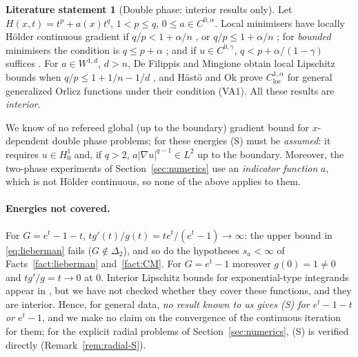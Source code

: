 \documentclass[11pt]{amsart}
\theoremstyle{definition}
\newtheorem{fact}[theorem]{Literature statement}
\theoremstyle{remark}
\numberwithin{equation}{section}
\newcommand{\abs}[1]{\lvert #1\rvert}
\begin{document}
\begin{fact}[Double phase: interior results only]\label{fact:dp}
Let $H(x,t)=t^p+a(x)t^q$, $1<p\le q$, $0\le a\in C^{0,\alpha}$. Local minimisers have locally H\"older continuous gradient if $q/p<1+\alpha/n$ \cite[Thm.~1.2]{ColomboMingione2015a}, or $q/p\le1+\alpha/n$ \cite[Thm.~1.1]{BaroniColomboMingione2018}; for \emph{bounded} minimisers the condition is $q\le p+\alpha$ \cite{ColomboMingione2015b,BaroniColomboMingione2018}; and if $u\in C^{0,\gamma}$, $q<p+\alpha/(1-\gamma)$ suffices \cite[Thm.~1.3]{BaroniColomboMingione2018}. For $a\in W^{1,d}$, $d>n$, De Filippis and Mingione obtain local Lipschitz bounds when $q/p\le1+1/n-1/d$ \cite[Thm.~1.3]{DeFilippisMingione2021}, and H\"ast\"o and Ok \cite{HastoOk2022} prove $C^{1,\alpha}_{\mathrm{loc}}$ for general generalized Orlicz functions under their condition (VA1). All these results are \emph{interior}.
\end{fact}
We know of no refereed global (up to the boundary) gradient bound for $x$-dependent double phase problems; for these energies (S) must be \emph{assumed}: it requires $u\in H^1_0$ and, if $q>2$, $a\abs{\nabla u}^{q-1}\in L^2$ up to the boundary. Moreover, the two-phase experiments of Section~\ref{sec:numerics} use an \emph{indicator function} $a$, which is not H\"older continuous, so none of the above applies to them.

\paragraph{Energies not covered.} For $G=e^t-1-t$, $tg'(t)/g(t)=te^t/(e^t-1)\to\infty$: the upper bound in \eqref{eq:lieberman} fails ($G\notin\Delta_2$), and so do the hypotheses $s_a<\infty$ of Facts~\ref{fact:lieberman} and~\ref{fact:CM}. For $G=e^t-1$ moreover $g(0)=1\ne0$ and $tg'/g=t\to0$ at $0$. Interior Lipschitz bounds for exponential-type integrands appear in \cite[Thms.~1.4--1.5]{DeFilippisMingione2021}, but we have not checked whether they cover these functions, and they are interior. Hence, for general data, \emph{no result known to us gives (S) for $e^t-1-t$ or $e^t-1$}, and we make no claim on the convergence of the continuous iteration for them; for the explicit radial problems of Section~\ref{sec:numerics}, (S) is verified directly (Remark~\ref{rem:radial-S}).
\end{document}
